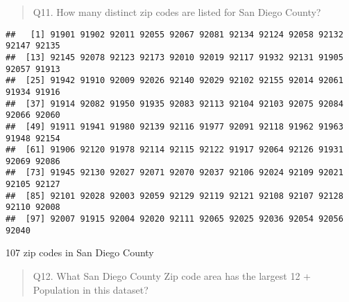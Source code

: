 \documentclass[
]{article}
\newenvironment{Shaded}{\begin{snugshade}}{\end{snugshade}}
\newcommand{\FunctionTok}[1]{\textcolor[rgb]{0.00,0.00,0.00}{#1}}
\newcommand{\NormalTok}[1]{#1}
\newcommand{\SpecialCharTok}[1]{\textcolor[rgb]{0.00,0.00,0.00}{#1}}
\begin{document}
\begin{quote}
Q11. How many distinct zip codes are listed for San Diego County?
\end{quote}

\begin{Shaded}
\end{Shaded}

\begin{verbatim}
##   [1] 91901 91902 92011 92055 92067 92081 92134 92124 92058 92132 92147 92135
##  [13] 92145 92078 92123 92173 92010 92019 92117 91932 92131 91905 92057 91913
##  [25] 91942 91910 92009 92026 92140 92029 92102 92155 92014 92061 91934 91916
##  [37] 91914 92082 91950 91935 92083 92113 92104 92103 92075 92084 92066 92060
##  [49] 91911 91941 91980 92139 92116 91977 92091 92118 91962 91963 91948 92154
##  [61] 91906 92120 91978 92114 92115 92122 91917 92064 92126 91931 92069 92086
##  [73] 91945 92130 92027 92071 92070 92037 92106 92024 92109 92021 92105 92127
##  [85] 92101 92028 92003 92059 92129 92119 92121 92108 92107 92128 92110 92008
##  [97] 92007 91915 92004 92020 92111 92065 92025 92036 92054 92056 92040
\end{verbatim}

107 zip codes in San Diego County

\begin{quote}
Q12. What San Diego County Zip code area has the largest 12 + Population
in this dataset?
\end{quote}

\begin{Shaded}
\end{Shaded}
\end{document}
